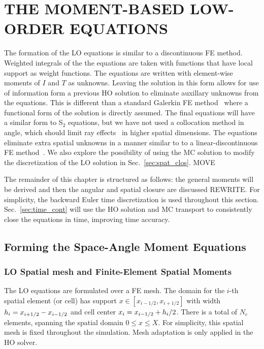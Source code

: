 
\chapter{\uppercase{The Moment-Based Low-Order Equations}}

The formation of the LO equations is similar to a discontinuous FE method.  Weighted
integrals of the the equations are taken with functions that have local support as weight
functions.  The equations are written with element-wise moments of $I$ and $T$ as
unknowns.  Leaving the solution in this form allows for use of information form a
previous HO solution to eliminate auxillary unknowns from the equations. This is different than a standard Galerkin FE
method~\cite{fe_book} where a
functional form of the solution is directly assumed. The final equations will have a
similar form to S$_2$ equations, but we have not used a collocation method in angle,
which should limit ray effects~\cite{ray_effects} in higher spatial dimensions.
The equations eliminate extra spatial unknowns in a manner similar to to a linear-discontinuous FE
method~\cite{morel_ldtrt}.  We also explore the
possibility of using the MC solution to modify the discretization of the LO solution in
Sec.~\ref{sec:spat_clos}.   MOVE


The remainder of this chapter is structured as follows: the general moments will be
derived and then the angular and spatial closure are discussed REWRITE.  For
simplicity, the backward Euler time discretization is used throughout this section.
Sec.~\ref{sec:time_cont} will use the HO solution and MC transport to consistently
close the equations in time, improving time accuracy.

\section{Forming the Space-Angle Moment Equations}

\subsection{LO Spatial mesh and Finite-Element Spatial Moments}

The LO equations are formulated over a FE mesh.  The domain for the $i$-th spatial
element (or cell) has support $x\in[x_{i-1/2},x_{i+1/2}]$ with width $h_i=x_{i+1/2} -
x_{{i-1/2}}$ and cell center 
$x_i = x_{{i-1/2}} + h_i/2$.  There is a total of $N_c$ elements, spanning the
spatial domain $0\leq x\leq X$.  For simplicity, this spatial mesh is fixed throughout the
simulation.  Mesh adaptation is only applied in the HO solver.

